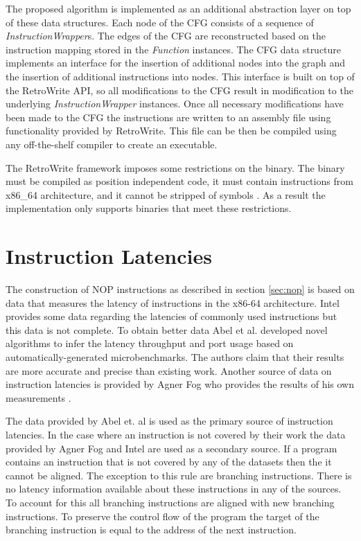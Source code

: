 The proposed algorithm is implemented as an additional abstraction layer on top of these data structures. 
Each node of the CFG consists of a sequence of \textit{InstructionWrapper}s. 
The edges of the CFG are reconstructed based on the instruction mapping stored in the \textit{Function} instances. 
The CFG data structure implements  an interface for the insertion of additional nodes into the graph and the insertion of additional instructions into nodes. 
This interface is built on top of the RetroWrite API, so all modifications to the CFG result in modification to the underlying \textit{InstructionWrapper} instances. 
Once all necessary modifications have been made to the CFG the instructions are written to an assembly file using functionality provided by RetroWrite. 
This file can be then be compiled using any off-the-shelf compiler to create an executable. 

The RetroWrite framework imposes some restrictions on the binary. The binary must be compiled as position independent code, it must contain instructions from x86\_64 architecture, and 
it cannot be stripped of symbols \cite{hexhive}. 
As a result the implementation only supports binaries that meet these restrictions. 


\section{Instruction Latencies}
\label{sec:latencies}
The construction of NOP instructions as described in section \ref{sec:nop} is based on data that measures the latency of instructions in the x86-64 architecture.
Intel provides some data regarding the latencies of commonly used instructions \cite{intel-ref-manual} but this data is not complete.
To obtain better data Abel et al.  \cite{uops} developed novel algorithms to infer the latency throughput and port usage based on automatically-generated microbenchmarks. 
The authors claim that their results are more accurate and precise than existing work. 
Another source of data on instruction latencies is provided by Agner Fog who provides the results of his own measurements \cite{fog_2021}. 

The data provided by Abel et. al is  used as the primary source of instruction latencies. In the case where an instruction is not covered by their work the data 
provided by Agner Fog and Intel are used as a secondary source. If a program contains an instruction that is not covered by any of the datasets then the it cannot
be aligned. The exception to this rule are branching instructions. There is no latency information available about these instructions in any of the sources. 
To account for this  all branching instructions are aligned with new branching instructions. To preserve the control flow of the program the target of 
the branching instruction is equal to the address of the next instruction. 

